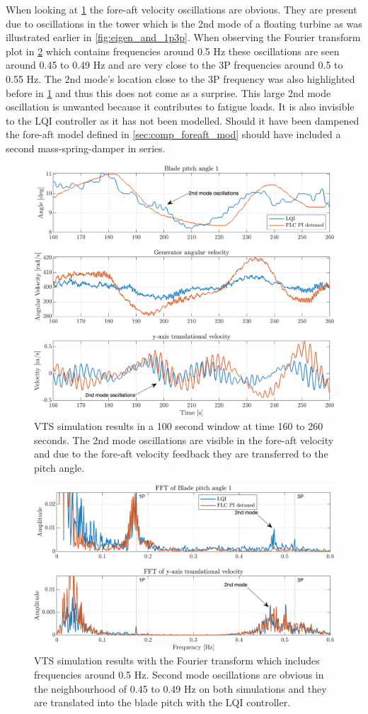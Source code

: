 When looking at \cref{fig:vts_12_zoom_th_w_py_vy} the fore-aft velocity oscillations are obvious. They are present due to oscillations in the tower which is the 2nd mode of a floating turbine as was illustrated earlier in \cref{fig:eigen_and_1p3p}. When observing the Fourier transform plot in \cref{fig:vts_13_zoom_fft_th_w_py_vy} which contains frequencies around 0.5 Hz these oscillations are seen around 0.45 to 0.49 Hz and are very close to the 3P frequencies around 0.5 to 0.55 Hz. The 2nd mode's location close to the 3P frequency was also highlighted before in \cref{fig:vts_12_zoom_th_w_py_vy} and thus this does not come as a surprise. This large 2nd mode oscillation is unwanted because it contributes to fatigue loads. It is also invisible to the LQI controller as it has not been modelled. Should it have been dampened the fore-aft model defined in \cref{sec:comp_foreaft_mod} should have included a second mass-spring-damper in series.
\begin{figure}[ht]
	\centering
	\includegraphics[width=0.7\linewidth]{Graphics/TestResults/VTSplotting/12_zoom_th_w_vy.png}
	\caption{VTS simulation results in a 100 second window at time 160 to 260 seconds. The 2nd mode oscillations are visible in the fore-aft velocity and due to the fore-aft velocity feedback they are transferred to the pitch angle.}
	\label{fig:vts_12_zoom_th_w_py_vy}
\end{figure}
\begin{figure}[ht]
	\centering
	\includegraphics[width=0.7\linewidth]{Graphics/TestResults/VTSplotting/13_zoom_fft_th_vy.png}
	\caption{VTS simulation results with the Fourier transform which includes frequencies around 0.5 Hz. Second mode oscillations are obvious in the neighbourhood of 0.45 to 0.49 Hz on both simulations and they are translated into the blade pitch with the LQI controller.}
	\label{fig:vts_13_zoom_fft_th_w_py_vy}
\end{figure}

